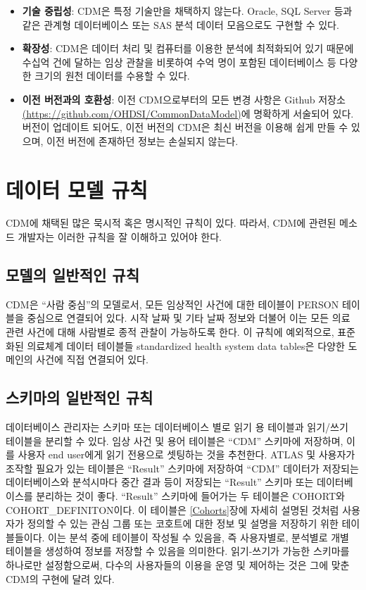 \documentclass[10.5pt]{book}
\theoremstyle{definition}
\theoremstyle{definition}
\theoremstyle{definition}
\theoremstyle{remark}
\begin{document}
\begin{itemize}
\item
  \textbf{기술 중립성}: CDM은 특정 기술만을 채택하지 않는다. Oracle, SQL
  Server 등과 같은 관계형 데이터베이스 또는 SAS 분석 데이터 모음으로도
  구현할 수 있다.
\item
  \textbf{확장성}: CDM은 데이터 처리 및 컴퓨터를 이용한 분석에
  최적화되어 있기 때문에 수십억 건에 달하는 임상 관찰을 비롯하여 수억
  명이 포함된 데이터베이스 등 다양한 크기의 원천 데이터를 수용할 수
  있다.
\item
  \textbf{이전 버전과의 호환성}: 이전 CDM으로부터의 모든 변경 사항은
  Github 저장소
  \href{https://github.com/OHDSI/CommonDataModel}{(https://github.com/OHDSI/CommonDataModel)}에
  명확하게 서술되어 있다. 버전이 업데이트 되어도, 이전 버전의 CDM은 최신
  버전을 이용해 쉽게 만들 수 있으며, 이전 버전에 존재하던 정보는
  손실되지 않는다.
\end{itemize}

\section{데이터 모델 규칙}\label{--}

CDM에 채택된 많은 묵시적 혹은 명시적인 규칙이 있다. 따라서, CDM에 관련된
메소드 개발자는 이러한 규칙을 잘 이해하고 있어야 한다.

\subsection{모델의 일반적인 규칙}\label{model-Conv}

CDM은 ``사람 중심''의 모델로서, 모든 임상적인 사건에 대한 테이블이
PERSON 테이블을 중심으로 연결되어 있다. 시작 날짜 및 기타 날짜 정보와
더불어 이는 모든 의료 관련 사건에 대해 사람별로 종적 관찰이 가능하도록
한다. 이 규칙에 예외적으로, 표준화된 의료체계 데이터 테이블들
standardized health system data tables은 다양한 도메인의 사건에 직접
연결되어 있다.

\subsection{스키마의 일반적인 규칙}\label{--}

데이터베이스 관리자는 스키마 또는 데이터베이스 별로 읽기 용 테이블과
읽기/쓰기 테이블을 분리할 수 있다. 임상 사건 및 용어 테이블은 ``CDM''
스키마에 저장하며, 이를 사용자 end user에게 읽기 전용으로 셋팅하는 것을
추천한다. ATLAS 및 사용자가 조작할 필요가 있는 테이블은 ``Result''
스키마에 저장하여 ``CDM'' 데이터가 저장되는 데이터베이스와 분석시마다
중간 결과 등이 저장되는 ``Result'' 스키마 또는 데이터베이스를 분리하는
것이 좋다. ``Result'' 스키마에 들어가는 두 테이블은 COHORT와
COHORT\_DEFINITON이다. 이 테이블은 \ref{Cohorts}장에 자세히 설명된
것처럼 사용자가 정의할 수 있는 관심 그룹 또는 코호트에 대한 정보 및
설명을 저장하기 위한 테이블들이다. 이는 분석 중에 테이블이 작성될 수
있음을, 즉 사용자별로, 분석별로 개별 테이블을 생성하여 정보를 저장할 수
있음을 의미한다. 읽기-쓰기가 가능한 스키마를 하나로만 설정함으로써,
다수의 사용자들의 이용을 운영 및 제어하는 것은 그에 맞춘 CDM의 구현에
달려 있다.
\end{document}

